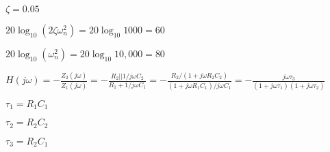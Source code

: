 \documentclass{article}
\def\lthtmlcheckvsize{\ifdim\ht\sizebox<\vsize 
  \ifdim\wd\sizebox<\hsize\expandafter\hfill\fi \expandafter\vfill
  \else\expandafter\vss\fi}%
\begin{document}
{\newpage\clearpage
{}%
$\zeta=0.05$%
\lthtmlindisplaymathZ
\lthtmlcheckvsize\clearpage}

{\newpage\clearpage
{}%
$20\log_{10} (2\zeta\omega_n^2)=20\log_{10} 1000=60$%
\lthtmlindisplaymathZ
\lthtmlcheckvsize\clearpage}

{\newpage\clearpage
{}%
$20\log_{10}(\omega_n^2)=20\log_{10} 10,000=80$%
\lthtmlindisplaymathZ
\lthtmlcheckvsize\clearpage}

{\newpage\clearpage
{}%
$\displaystyle H(j\omega)=-\frac{Z_2(j\omega)}{Z_1(j\omega)}
=-\frac{R_2||1/j\omega C_2}{R_1+1/j\omega C_1}
=-\frac{R_2/(1+j\omega R_2C_2)}{(1+j\omega R_1C_1)/j\omega C_1}
=-\frac{j\omega \tau_3}{(1+j\omega \tau_1)(1+j\omega \tau_2)} $%
\lthtmlindisplaymathZ
\lthtmlcheckvsize\clearpage}

{\newpage\clearpage
{}%
$\tau_1=R_1C_1$%
\lthtmlindisplaymathZ
\lthtmlcheckvsize\clearpage}

{\newpage\clearpage
{}%
$\tau_2=R_2C_2$%
\lthtmlindisplaymathZ
\lthtmlcheckvsize\clearpage}

{\newpage\clearpage
{}%
$\tau_3=R_2C_1$%
\lthtmlindisplaymathZ
\lthtmlcheckvsize\clearpage}
\end{document}
